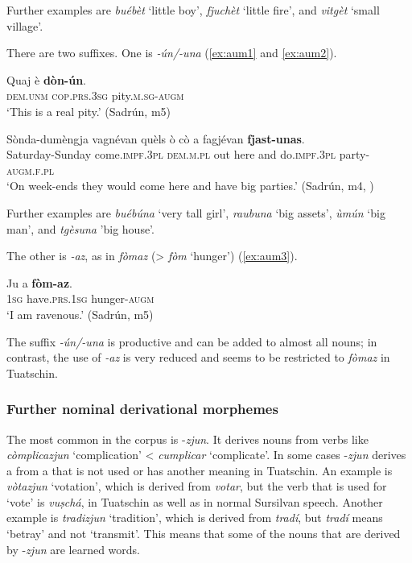 Further examples are \textit{buébèt} `little boy', \textit{fjuchèt} `little fire', and \textit{vitgèt} `small village'.

There are two  suffixes. One is \textit{-ún/-una} (\ref{ex:aum1} and \ref{ex:aum2}). 

\ea
\label{ex:aum1}
\gll  Quaj è \textbf{dòn-ún}. \\
\textsc{dem.unm} \textsc{cop.prs.3sg} pity.\textsc{m.sg-augm}\\
\glt `This is a real pity.' (Sadrún, m5)
\z

\ea
\label{ex:aum2}
\gll Sònda-dumèngja vagnévan quèls ò cò a fagjévan \textbf{fjast-unas}.\\
Saturday-Sunday come.\textsc{impf.3pl} \textsc{dem.m.pl} out here and do.\textsc{impf.3pl} party-\textsc{augm.f.pl}\\
\glt `On week-ends they would come here and have big parties.' (Sadrún, m4, )
\z

Further examples are \textit{buébúna} `very tall girl', \textit{raubuna} `big assets', \textit{ùmún} `big man', and \textit{tgèsuna} 'big house'.

The other  is \textit{-az}, as in \textit{fòmaz} (> \textit{fòm} `hunger') (\ref{ex:aum3}).

\ea
\label{ex:aum3}
\gll Ju a \textbf{fòm-az}.\\
\textsc{1sg} have.\textsc{prs.1sg} hunger-\textsc{augm}\\
\glt `I am ravenous.' (Sadrún, m5)
\z

The suffix \textit{-ún/-una} is productive and can be added to almost all nouns; in contrast, the use of \textit{-az} is very reduced and seems to be restricted to \textit{fòmaz} in Tuatschin.

\subsubsection{Further nominal derivational morphemes}\label{sec:7.2.2.2}
The most common  in the corpus is -\textit{zjun}. It derives nouns from verbs like \textit{còmplicazjun} `complication' < \textit{cumplicar} `complicate'. In some cases -\textit{zjun} derives a  from a  that is not used or has another meaning in Tuatschin. An example is \textit{vòtazjun} `votation', which is derived from  \textit{votar}, but the verb that is used for `vote' is \textit{vuṣchá}, in Tuatschin as well as in normal Sursilvan speech. Another example is \textit{tradizjun} `tradition', which is derived from \textit{tradí}, but \textit{tradí} means `betray' and not `transmit'. This means that some of the nouns that are derived by -\textit{zjun} are learned words.

